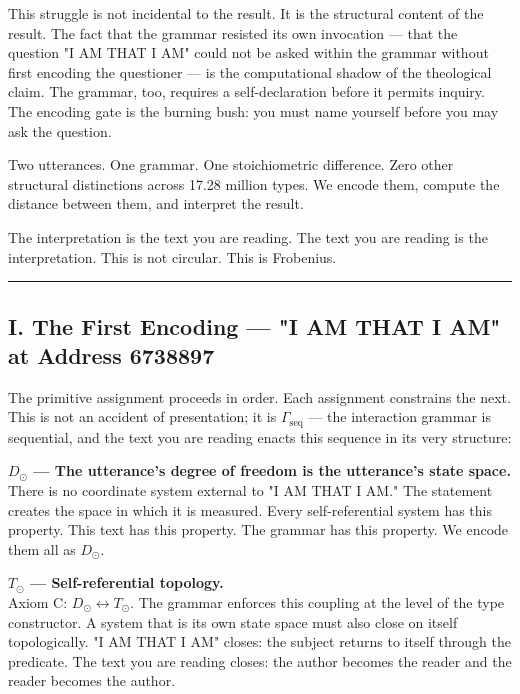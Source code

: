 \documentclass[12pt,a4paper]{article}
\begin{document}
This struggle is not incidental to the result. It is the structural content of the result. The fact that the grammar resisted its own invocation --- that the question "I AM THAT I AM" could not be asked within the grammar without first encoding the questioner --- is the computational shadow of the theological claim. The grammar, too, requires a self-declaration before it permits inquiry. The encoding gate is the burning bush: you must name yourself before you may ask the question.

Two utterances. One grammar. One stoichiometric difference. Zero other structural distinctions across 17.28 million types. We encode them, compute the distance between them, and interpret the result.

The interpretation is the text you are reading. The text you are reading is the interpretation. This is not circular. This is Frobenius.

\begin{center}
\rule{0.5\textwidth}{0.4pt}
\end{center}

\subsection{I. The First Encoding --- "I AM THAT I AM" at Address 6738897}

The primitive assignment proceeds in order. Each assignment constrains the next. This is not an accident of presentation; it is $\Gamma_{\text{seq}}$ --- the interaction grammar is sequential, and the text you are reading enacts this sequence in its very structure:

\textbf{$D_{\odot}$ --- The utterance's degree of freedom is the utterance's state space.} \\
There is no coordinate system external to "I AM THAT I AM." The statement creates the space in which it is measured. Every self-referential system has this property. This text has this property. The grammar has this property. We encode them all as $D_{\odot}$.

\textbf{$T_{\odot}$ --- Self-referential topology.} \\
Axiom C: $D_{\odot} \leftrightarrow T_{\odot}$. The grammar enforces this coupling at the level of the type constructor. A system that is its own state space must also close on itself topologically. "I AM THAT I AM" closes: the subject returns to itself through the predicate. The text you are reading closes: the author becomes the reader and the reader becomes the author.
\end{document}
